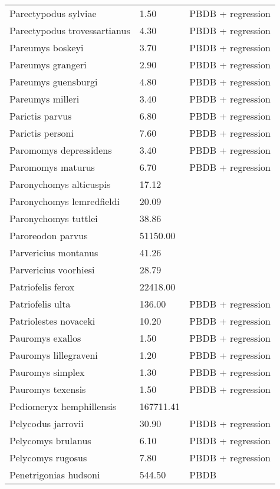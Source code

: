 \documentclass{article}
\begin{document}
\begin{center}
\begin{longtable}{p{} p{} p{}}
    Parectypodus sylviae & 1.50 & PBDB + regression \\ 
    Parectypodus trovessartianus & 4.30 & PBDB + regression \\ 
    Pareumys boskeyi & 3.70 & PBDB + regression \\ 
    Pareumys grangeri & 2.90 & PBDB + regression \\ 
    Pareumys guensburgi & 4.80 & PBDB + regression \\ 
    Pareumys milleri & 3.40 & PBDB + regression \\ 
    Parictis parvus & 6.80 & PBDB + regression \\ 
    Parictis personi & 7.60 & PBDB + regression \\ 
    Paromomys depressidens & 3.40 & PBDB + regression \\ 
    Paromomys maturus & 6.70 & PBDB + regression \\ 
    Paronychomys alticuspis & 17.12 & \cite{Tomiya2013} \\ 
    Paronychomys lemredfieldi & 20.09 & \cite{Tomiya2013} \\ 
    Paronychomys tuttlei & 38.86 & \cite{Tomiya2013} \\ 
    Paroreodon parvus & 51150.00 & \cite{McKenna2011} \\ 
    Parvericius montanus & 41.26 & \cite{Tomiya2013} \\ 
    Parvericius voorhiesi & 28.79 & \cite{Tomiya2013} \\ 
    Patriofelis ferox & 22418.00 & \cite{McKenna2011} \\ 
    Patriofelis ulta & 136.00 & PBDB + regression \\ 
    Patriolestes novaceki & 10.20 & PBDB + regression \\ 
    Pauromys exallos & 1.50 & PBDB + regression \\ 
    Pauromys lillegraveni & 1.20 & PBDB + regression \\ 
    Pauromys simplex & 1.30 & PBDB + regression \\ 
    Pauromys texensis & 1.50 & PBDB + regression \\ 
    Pediomeryx hemphillensis & 167711.41 & \cite{Tomiya2013} \\ 
    Pelycodus jarrovii & 30.90 & PBDB + regression \\ 
    Pelycomys brulanus & 6.10 & PBDB + regression \\ 
    Pelycomys rugosus & 7.80 & PBDB + regression \\ 
    Penetrigonias hudsoni & 544.50 & PBDB \\ 

\end{longtable}
\end{center}
\end{document}
